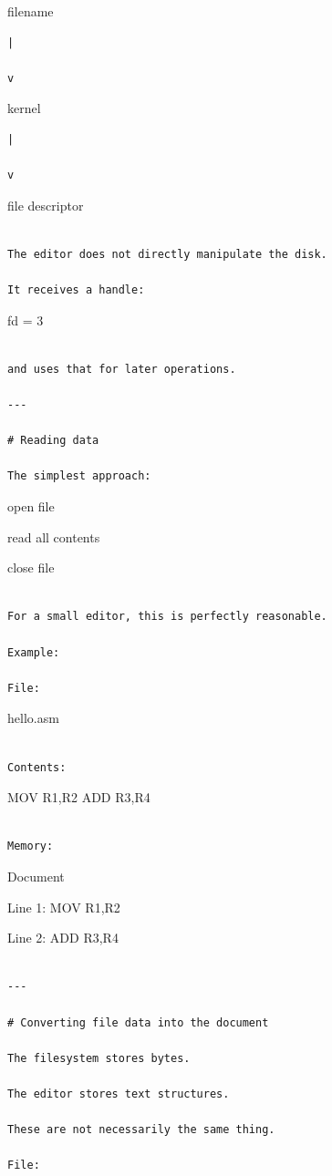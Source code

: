 \documentclass[
  oneside,
  openany]{book}
\begin{document}
filename

\begin{verbatim}
|

v
\end{verbatim}

kernel

\begin{verbatim}
|

v
\end{verbatim}

file descriptor

\begin{verbatim}

The editor does not directly manipulate the disk.

It receives a handle:
\end{verbatim}

fd = 3

\begin{verbatim}

and uses that for later operations.

---

# Reading data

The simplest approach:
\end{verbatim}

open file

read all contents

close file

\begin{verbatim}

For a small editor, this is perfectly reasonable.

Example:

File:
\end{verbatim}

hello.asm

\begin{verbatim}

Contents:
\end{verbatim}

MOV R1,R2 ADD R3,R4

\begin{verbatim}

Memory:
\end{verbatim}

Document

Line 1: MOV R1,R2

Line 2: ADD R3,R4

\begin{verbatim}

---

# Converting file data into the document

The filesystem stores bytes.

The editor stores text structures.

These are not necessarily the same thing.

File:
\end{verbatim}
\end{document}
